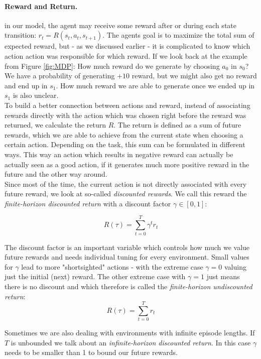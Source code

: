 \paragraph{Reward and Return.} %
in our model, the agent may receive some reward after or during each state transition: $r_t = R(s_t, a_t, s_{t+1})$. The agents goal is to maximize the total sum of expected reward, but - as we discussed earlier - it is complicated to know which action action was responsible for which reward. If we look back at the example from Figure \ref{fig:MDP}: How much reward do we generate by choosing $a_0$ in $s_0$? We have a probability of generating $+10$ reward, but we might also get no reward and end up in $s_1$. How much reward we are able to generate once we ended up in $s_1$ is also unclear. \\
To build a better connection between actions and reward, instead of associating rewards directly with the action which was chosen right before the reward was returned, we calculate the return $R$. The return is defined as a sum of future rewards, which we are able to achieve from the current state when choosing a certain action. Depending on the task, this sum can be formulated in different ways. This way an action which results in negative reward can actually be actually seen as a good action, if it generates much more positive reward in the future and the other way around.  \\
Since most of the time, the current action is not directly associated with every future reward, we look at so-called \textit{discounted rewards}. We call this reward the \textit{finite-horizon discounted return} with a discount factor $\gamma \in [0, 1]$:

\[R(\tau) = \sum_{t=0}^T \gamma^t r_t\]

The discount factor is an important variable which controls how much we value future rewards and needs individual tuning for every environment. Small values for $\gamma$ lead to more "shortsighted" actions - with the extreme case $\gamma = 0$ valuing just the initial (next) reward. The other extreme case with $\gamma = 1$ just means there is no discount and which therefore is called the \textit{finite-horizon undiscounted return}: 
\[R(\tau) = \sum_{t=0}^T r_t\] 

Sometimes we are also dealing with environments with infinite episode lengths. If $T$ is unbounded we talk about an \textit{infinite-horizon discounted return}. In this case $\gamma$ needs to be smaller than 1 to bound our future rewards.

